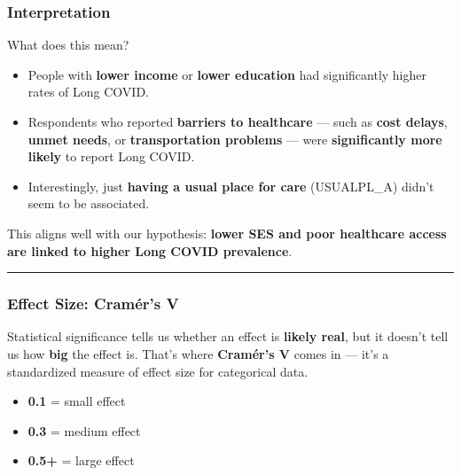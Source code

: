 \documentclass[
]{article}
\newenvironment{Shaded}{\begin{snugshade}}{\end{snugshade}}
\newcommand{\CommentTok}[1]{\textcolor[rgb]{0.56,0.35,0.01}{\textit{#1}}}
\newcommand{\FunctionTok}[1]{\textcolor[rgb]{0.13,0.29,0.53}{\textbf{#1}}}
\newcommand{\NormalTok}[1]{#1}
\newcommand{\SpecialCharTok}[1]{\textcolor[rgb]{0.81,0.36,0.00}{\textbf{#1}}}
\providecommand{\tightlist}{%
  \setlength{\itemsep}{0pt}\setlength{\parskip}{0pt}}
\begin{document}
\subsubsection{Interpretation}\label{interpretation}

What does this mean?

\begin{itemize}
\tightlist
\item
  People with \textbf{lower income} or \textbf{lower education} had
  significantly higher rates of Long COVID.
\item
  Respondents who reported \textbf{barriers to healthcare} --- such as
  \textbf{cost delays}, \textbf{unmet needs}, or \textbf{transportation
  problems} --- were \textbf{significantly more likely} to report Long
  COVID.
\item
  Interestingly, just \textbf{having a usual place for care}
  (USUALPL\_A) didn't seem to be associated.
\end{itemize}

This aligns well with our hypothesis: \textbf{lower SES and poor
healthcare access are linked to higher Long COVID prevalence}.

\begin{center}\rule{0.5\linewidth}{0.5pt}\end{center}

\subsubsection{Effect Size: Cramér's V}\label{effect-size-cramuxe9rs-v}

Statistical significance tells us whether an effect is \textbf{likely
real}, but it doesn't tell us how \textbf{big} the effect is. That's
where \textbf{Cramér's V} comes in --- it's a standardized measure of
effect size for categorical data.

\begin{itemize}
\tightlist
\item
  \textbf{0.1} = small effect
\item
  \textbf{0.3} = medium effect
\item
  \textbf{0.5+} = large effect
\end{itemize}

\begin{Shaded}
\end{Shaded}
\end{document}

